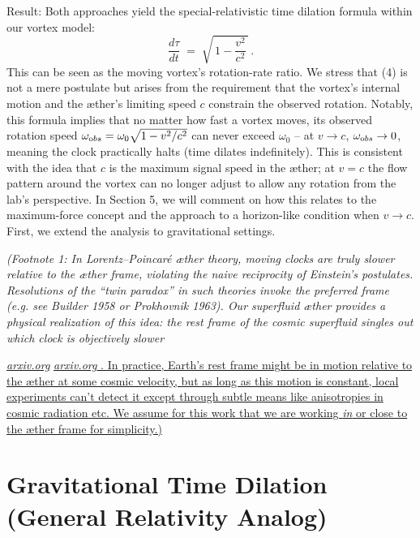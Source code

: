 \documentclass[aps,preprint,superscriptaddress]{revtex4}
\begin{document}
Result: Both approaches yield the special-relativistic time dilation formula within our vortex model:
\begin{equation}
\boxed{\frac{d\tau}{dt} \;=\; \sqrt{\,1-\frac{v^2}{c^2}\,}\,.} \tag{4}
\end{equation}
This can be seen as the moving vortex’s rotation-rate ratio. We stress that (4) is not a mere postulate but arises from the requirement that the vortex’s internal motion and the æther’s limiting speed $c$ constrain the observed rotation. Notably, this formula implies that no matter how fast a vortex moves, its observed rotation speed $\omega_{\textrm obs}=\omega_0\sqrt{1-v^2/c^2}$ can never exceed $\omega_0$ – at $v\to c$, $\omega_{\textrm obs}\to 0$, meaning the clock practically halts (time dilates indefinitely). This is consistent with the idea that $c$ is the maximum signal speed in the æther; at $v=c$ the flow pattern around the vortex can no longer adjust to allow any rotation from the lab’s perspective. In Section 5, we will comment on how this relates to the maximum-force concept and the approach to a horizon-like condition when $v\to c$. First, we extend the analysis to gravitational settings.


\textit{(Footnote 1: In Lorentz–Poincaré æther theory, moving clocks are truly slower relative to the æther frame, violating the naive reciprocity of Einstein’s postulates. Resolutions of the “twin paradox” in such theories invoke the preferred frame (e.g. see Builder 1958 or Prokhovnik 1963). Our superfluid æther provides a physical realization of this idea: the rest frame of the cosmic superfluid singles out which clock is objectively slower }

\href{https://arxiv.org/pdf/physics/0611077#:~:text=We%20should%20note%20that%2C%20when,a%20state%20of%20absolute%20rest}{\textit{arxiv.org}}
\href{https://arxiv.org/pdf/physics/0611077#:~:text=The%20resolution%20of%20the%20paradoxes,ordinate}{\textit{arxiv.org}
. In practice, Earth’s rest frame might be in motion relative to the æther at some cosmic velocity, but as long as this motion is constant, local experiments can’t detect it except through subtle means like anisotropies in cosmic radiation etc. We assume for this work that we are working \textit{in} or close to the æther frame for simplicity.)}


\section*{Gravitational Time Dilation (General Relativity Analog)}
\end{document}
